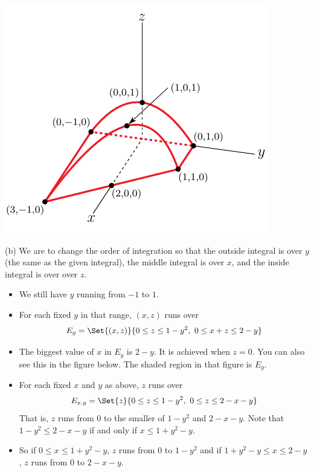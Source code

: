 \begin{solution}
\begin{center}
     \includegraphics{fig/OE05D_9c.pdf}
\end{center}

(b) We are to change the order of integration so that the outside 
integral is over $y$ (the same as the given integral),
the middle integral is over $x$, and the inside integral is over
over $z$. 
\begin{itemize}
\item
We still have $y$ running from $-1$ to $1$.
\item
For each fixed $y$ in that range, $(x,z)$ runs over
\begin{equation*}
E_y=\Set{(x,z)}{0\le z\le 1-y^2,\ 0\le x+z\le 2-y}
\end{equation*}
\item 
The biggest value of $x$ in $E_y$ is $2-y$. It is achieved
when $z=0$. You can also see this in the figure below.
The shaded region in that figure is $E_y$.
\item
For each fixed $x$ and $y$ as above,  $z$ runs over
\begin{equation*}
E_{x,y} = \Set{z}{0\le z\le 1-y^2,\ 0\le z\le 2-x-y}
\end{equation*}
That is, $z$ runs from $0$ to the smaller of
$1-y^2$ and $2-x-y$. Note that $1-y^2\le 2-x-y$
if and only if $x\le 1+y^2-y$.
\item
So if $0\le x\le 1+y^2-y$, $z$ runs from $0$ to $1-y^2$
and if $1+y^2-y\le x\le 2-y$, $z$ runs from $0$ to $2-x-y$.
\end{itemize}


\end{solution}
